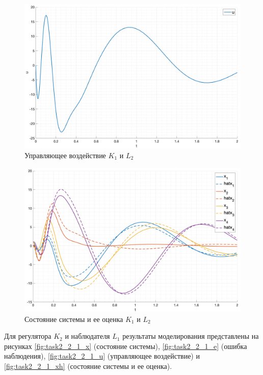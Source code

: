 \begin{figure}[ht!]
    \centering
    \includegraphics[width=\textwidth]{media/plots/task2_2_u.png}
    \caption{Управляющее воздействие $K_1$ и $L_2$}
    \label{fig:task2_1_2_u}
\end{figure}
\begin{figure}[ht!]
    \centering
    \includegraphics[width=\textwidth]{media/plots/task2_2_xh.png}
    \caption{Состояние системы и ее оценка $K_1$ и $L_2$}
    \label{fig:task2_1_2_xh}
\end{figure}
\FloatBarrier

Для регулятора $K_2$ и наблюдателя $L_1$ результаты моделирования представлены на рисунках \ref{fig:task2_2_1_x} 
(состояние системы), \ref{fig:task2_2_1_e} (ошибка наблюдения), \ref{fig:task2_2_1_u} (управляющее воздействие) и \ref{fig:task2_2_1_xh} 
(состояние системы и ее оценка).

